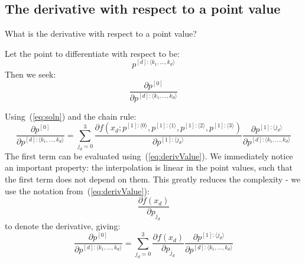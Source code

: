 \documentclass[11pt]{article}
\begin{document}

\subsection{The derivative with respect to a point value}


What is the derivative with respect to a point value? 

Let the point to differentiate with respect to be:
\begin{equation}
p^{[d]: \langle k_1, \dots, k_d \rangle}
\end{equation}
Then we seek:
\begin{equation}
\frac{\partial p^{[0]}}{\partial p^{[d]: \langle k_1, \dots, k_d \rangle}}
\end{equation}

Using~(\ref{eq:soln}) and the chain rule:
\begin{equation}
\frac{\partial p^{[0]}}{\partial p^{[d]: \langle k_1, \dots, k_d \rangle}}
=
\sum_{j_d=0}^3 \frac{\partial f \left ( 
x_d ; 
p^{[1]: \langle 0 \rangle},
p^{[1]: \langle 1 \rangle},
p^{[1]: \langle 2 \rangle},
p^{[1]: \langle 3 \rangle}
\right )
}{
\partial p^{[1]: \langle j_d \rangle}
}
\frac{
\partial p^{[1]: \langle j_d \rangle}
}{
\partial p^{[d]: \langle k_1, \dots, k_d \rangle}
}
\end{equation}
The first term can be evaluated using~(\ref{eq:derivValue}). We immediately notice an important property: the interpolation is linear in the point values, such that the first term does not depend on them. This greatly reduces the complexity - we use the notation from~(\ref{eq:derivValue}):
\begin{equation}
\frac{ 
\partial f(x_d)
}{
\partial p_{j_d}
}
\end{equation}
to denote the derivative, giving:
\begin{equation}
\frac{\partial p^{[0]}}{\partial p^{[d]: \langle k_1, \dots, k_d \rangle}}
=
\sum_{j_d=0}^3 
\frac{ 
\partial f(x_d)
}{
\partial p_{j_d}
}
\frac{
\partial p^{[1]: \langle j_d \rangle}
}{
\partial p^{[d]: \langle k_1, \dots, k_d \rangle}
}
\end{equation}
\end{document}
